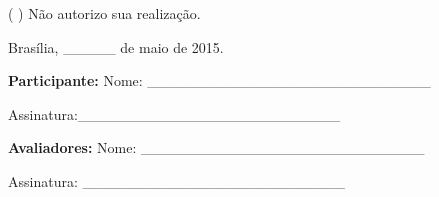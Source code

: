       ( ) Não autorizo sua realização. 
      
      \begin{flushright}
      
      Brasília, \_\_\_\_\_ de maio de 2015. 
      
      \textbf{Participante:}  Nome: \_\_\_\_\_\_\_\_\_\_\_\_\_\_\_\_\_\_\_\_\_\_\_\_\_\_\_ 
      
      Assinatura:\_\_\_\_\_\_\_\_\_\_\_\_\_\_\_\_\_\_\_\_\_\_\_\_\_  
      
        \textbf{Avaliadores:}  Nome: \_\_\_\_\_\_\_\_\_\_\_\_\_\_\_\_\_\_\_\_\_\_\_\_\_\_\_ 
        
         Assinatura: \_\_\_\_\_\_\_\_\_\_\_\_\_\_\_\_\_\_\_\_\_\_\_\_\_ 
      
       \end{flushright}